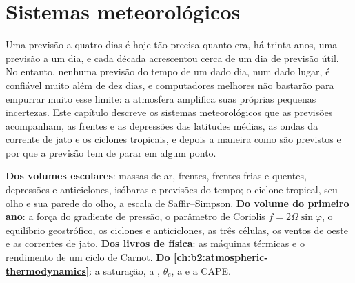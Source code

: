 \chapter{Sistemas meteorológicos}\label{ch:b2:weather-systems}

Uma previsão a quatro dias é hoje tão precisa quanto era, há trinta anos, uma previsão a um dia,
e cada década acrescentou cerca de um dia de previsão útil. No entanto, nenhuma previsão do
tempo de um dado dia, num dado lugar, é confiável muito além de dez dias, e computadores melhores
não bastarão para empurrar muito esse limite: a atmosfera amplifica suas próprias pequenas incertezas. Este
capítulo descreve os sistemas meteorológicos que as previsões acompanham, as frentes e as depressões das
latitudes médias, as ondas da corrente de jato e os ciclones tropicais, e depois a maneira como são
previstos e por que a previsão tem de parar em algum ponto.

\begin{recall}
\textbf{Dos volumes escolares}: massas de ar, frentes, frentes frias e quentes, depressões e
anticiclones, isóbaras e previsões do tempo; o ciclone tropical, seu olho e sua parede do olho, a
escala de Saffir--Simpson. \textbf{Do volume do primeiro ano}: a força do gradiente de pressão, o
parâmetro de Coriolis $f = 2\Omega\sin\varphi$, o equilíbrio geostrófico, os ciclones e anticiclones, as
três células, os ventos de oeste e as correntes de jato. \textbf{Dos livros de física}: as máquinas térmicas
e o rendimento de um ciclo de Carnot. \textbf{Do \cref{ch:b2:atmospheric-thermodynamics}}:
a saturação, a , $\theta_e$, a  e a CAPE.
\end{recall}

